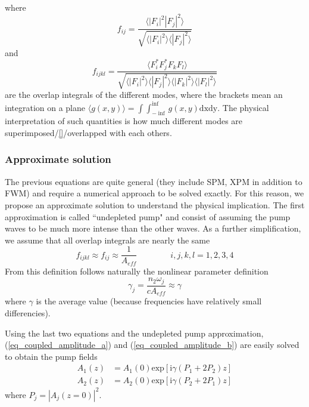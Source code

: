 \documentclass[12pt,a4paper,twoside]{article}
\begin{document}
where
\begin{equation}
	f_{ij} = \frac{\langle |F_i|^2 |F_j|^2 \rangle}{\sqrt{\langle |F_i|^2 \rangle\langle |F_j|^2 \rangle}}
\end{equation}
\hspace{18pt}and
\begin{equation}
	f_{ijkl} = \frac{\langle F_i^* F_j^* F_k F_l \rangle}{\sqrt{\langle |F_i|^2 \rangle\langle |F_j|^2 \rangle\langle |F_k|^2 \rangle\langle |F_l|^2 \rangle}}
\end{equation}
\hspace{18pt}are the overlap integrals of the different modes, where the brackets mean an integration on a plane $\langle g(x,y)\rangle = \int\int_{-\inf}^{\inf}g(x,y)\mathrm{dxdy}$.
The physical interpretation of such quantities is how much different modes are superimposed/\ref{}/overlapped with each others.

\subsubsection*{Approximate solution}
The previous equations are quite general (they include SPM, XPM in addition to FWM) and require a numerical approach to be solved exactly.
For this reason, we propose an approximate solution to understand the physical implication.
The first approximation is called ``undepleted pump" and consist of assuming the pump waves to be much more intense than the other waves.
As a further simplification, we assume that all overlap integrals are nearly the same
\begin{equation}
	f_{ijkl} \approx f_{ij} \approx \frac{1}{A_{eff}}	\qquad \qquad i,j,k,l = 1,2,3,4
	\label{eq_overlap_approx}
\end{equation}
From this definition follows naturally the nonlinear parameter definition
\begin{equation}
	\gamma_j = \frac{n_2\omega_j}{cA_{eff}} \approx \gamma
	\label{eq_gamma_approx}
\end{equation}
where $\gamma$ is the average value (because frequencies have relatively small differencies).

Using the last two equations and the undepleted pump approximation, (\ref{eq_coupled_amplitude_a}) and (\ref{eq_coupled_amplitude_b}) are easily solved to obtain the pump fields
\begin{subequations}
\begin{align}
	A_1(z) &= A_1(0)\mathrm{exp}[\mathrm{i}\gamma(P_1 + 2P_2)z] \\
	A_2(z) &= A_2(0)\mathrm{exp}[\mathrm{i}\gamma(P_2 + 2P_1)z]
\end{align}
	\label{eq_pump_sol}
\end{subequations}
where $P_j = |A_j(z=0)|^2$.
\end{document}
